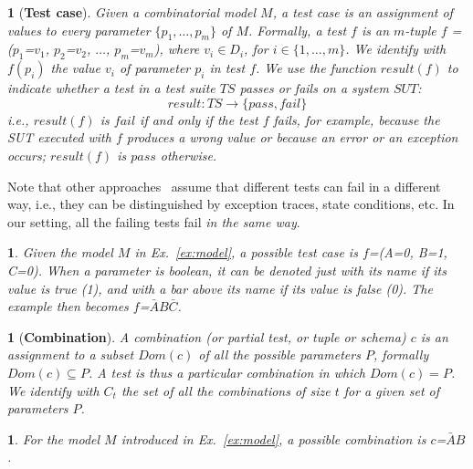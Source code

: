 \documentclass[
12pt, %
oneside, %
english, %
singlespacing, %
headsepline, %
consistentlayout, %
]{MastersDoctoralThesis} %
\newcommand{\dom}{\ensuremath{\mathit{Dom}}\xspace}
\newcommand{\oracle}{\ensuremath{\mathit{oracle}}\xspace}
\newcommand{\result}{\ensuremath{\mathit{result}}\xspace}
\newtheorem{defn}[thm]{\protect\definitionname}
\newtheorem{example}[thm]{\protect\examplename}
\providecommand{\definitionname}{Definition}
\providecommand{\examplename}{Example}
\theoremstyle{plain}
\theoremstyle{definition}
\theoremstyle{remark}
\theoremstyle{plain}
\theoremstyle{plain}
\providecommand{\definitionname}{Definition}
\providecommand{\examplename}{Example}
\theoremstyle{remark}
\begin{document}
\begin{defn}[\textbf{Test case}]\label{def:testCase}
	Given a combinatorial model $M$, a {\it test case} is an assignment of values to every parameter $\{p_1, \dots , p_m\}$ of $M$. Formally, a test $f$ is an $m$-tuple $f$ = ($p_1$=$v_1$, $p_2$=$v_2$, $\ldots$, $p_m$=$v_m$), where $v_i \in D_i$, for $i \in \{1, \ldots, m\}$. We identify with $f(p_i)$ the value $v_i$ of parameter $p_i$ in test $f$. We use the function $\result(f)$ to indicate whether a test in a test suite $\mathit{TS}$ passes or fails on a system $\mathit{SUT}$: %
	\[\result: \mathit{TS} \rightarrow \{\mathit{pass},\mathit{fail}\}\]
	i.e., $\result(f)$ is $\mathit{fail}$ if and only if the test $f$ fails, for example, because the SUT executed with $f$ produces a wrong value or because an error or an exception occurs; $\result(f)$ is $\mathit{pass}$ otherwise.
\end{defn}

Note that other approaches~\cite{Niu2018Identifying} assume that different tests can fail in a different way, i.e., they can be distinguished by exception traces, state conditions, etc. In our setting, all the failing tests fail {\it in the same way}.

\begin{example}
	Given the model $M$ in Ex.~\ref{ex:model}, a possible test case is $f$=(A=0, B=1, C=0). When a parameter is boolean, it can be denoted just with its name if its value is \textit{true} (1), and with a bar above its name if its value is \textit{false} (0). The example then becomes $f$=$\bar{A}B\bar{C}$.
\end{example}

\begin{defn}[\textbf{Combination}]\label{def:combination}
	A \textit{combination} (or \textit{partial test}, or \textit{tuple} or \textit{schema}) $c$ is an assignment to a subset $\dom(c)$ of all the possible parameters $P$, formally $\dom(c) \subseteq P$. A test is thus a particular combination in which $\dom(c)=P$. We identify with $C_t$ the set of all the combinations of size $t$ for a given set of parameters $P$.
\end{defn}

\begin{example}
	For the model $M$ introduced in Ex.~\ref{ex:model}, a possible combination is $c$=$\bar{A}B$.
\end{example}
\end{document}
